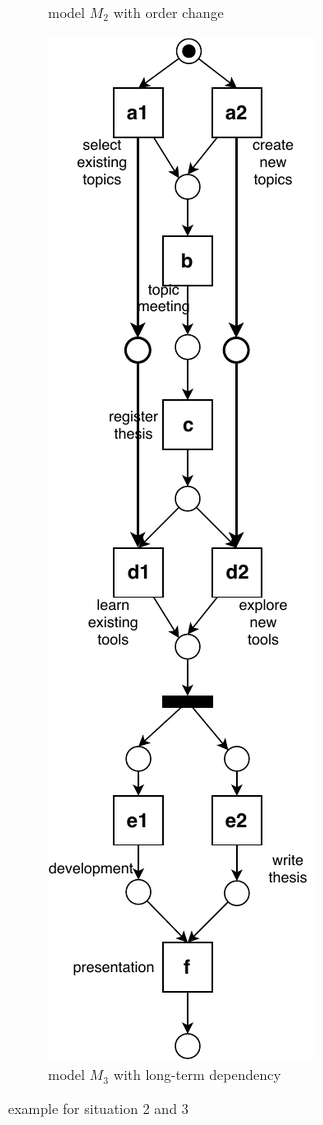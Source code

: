 \begin{figure}[htp]
\begin{subfigure}[b]{0.5\textwidth}
		\caption{model $M_{2}$ with order change}
		\label{fig:demo_s2_order}
	\end{subfigure}%
	\begin{subfigure}[b]{0.5\textwidth}
		\centering
		\includegraphics[width=0.8\linewidth, height=0.8\textheight]{figures/introduction/thesis-demo-s3-lt.pdf}
		\caption{model $M_{3}$ with long-term dependency}
		\label{fig:demo_s3_expected}
	\end{subfigure}
	\caption{example for situation 2 and 3}
	\label{fig:model_demo_2_3}
\end{figure}
